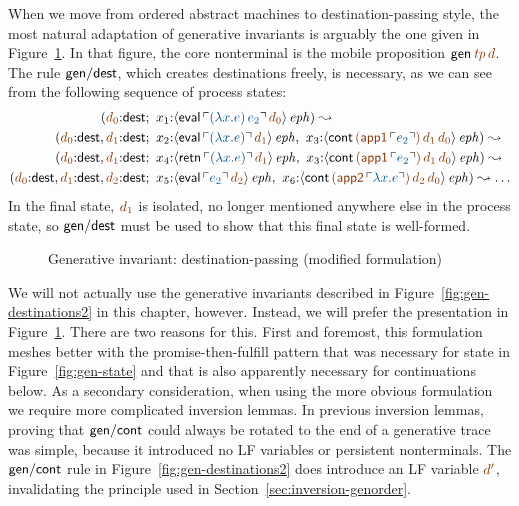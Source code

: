 When we move from ordered abstract machines to destination-passing
style, the most natural adaptation of generative invariants is
arguably the one given in Figure~\ref{fig:gen-destinations}. In that
figure, the core nonterminal is the mobile proposition ${\sf
  gen}\,\lf{{\it tp}}\,\lf{d}$. The rule ${\sf gen/dest}$, which 
creates destinations freely, is
necessary, as we can see from the following sequence of 
process states:
\begin{align*}
( \lf{d_0}{:}{\sf dest}&; ~
       x_1{:}\iseph{\susp{{\sf eval}
          \,\lf{\interp{(\lambda x.e)\,e_2}}\,\lf{d_0}}}
) 
\leadsto
\\
( \lf{d_0}{:}{\sf dest}, \lf{d_1}{:}{\sf dest}&; ~ 
       x_2{:}\iseph{\susp{{\sf eval}\,\lf{\interp{(\lambda x.e)}}\,\lf{d_1}}}, ~
       x_3{:}\iseph{\susp{{\sf cont}
          \,\lf{({\sf app1}\,\interp{e_2})}\,\lf{d_1}\,\lf{d_0}}}
)
\leadsto
\\
( \lf{d_0}{:}{\sf dest}, \lf{d_1}{:}{\sf dest}&; ~ 
       x_4{:}\iseph{\susp{{\sf retn}\,\lf{\interp{(\lambda x.e)}}\,\lf{d_1}}}, ~
       x_3{:}\iseph{\susp{{\sf cont}
          \,\lf{({\sf app1}\,\interp{e_2})}\,\lf{d_1}\,\lf{d_0}}}
)
\leadsto
\\
( \lf{d_0}{:}{\sf dest}, \lf{d_1}{:}{\sf dest}, \lf{d_2}{:}{\sf dest}&; ~ 
       x_5{:}\iseph{\susp{{\sf eval}\,\lf{\interp{e_2}}\,\lf{d_2}}}, ~
       x_6{:}\iseph{\susp{{\sf cont}
          \,\lf{({\sf app2}\,\interp{\lambda x.e})}\,\lf{d_2}\,\lf{d_0}}}
)
\leadsto \ldots
\end{align*}
In the final state, $\lf{d_1}$ is isolated, no longer mentioned
anywhere else in the process state, so ${\sf gen/dest}$ must be used
to show that this final state is well-formed.

\begin{figure}[tp]
\caption{Generative invariant: destination-passing (modified formulation)}
\label{fig:gen-destinations} 
\end{figure}

We will not actually use the generative invariants described in
Figure~\ref{fig:gen-destinations2} in this chapter, however. Instead,
we will prefer the presentation in Figure~\ref{fig:gen-destinations}.
There are two reasons for this. First and foremost, this formulation
meshes better with the promise-then-fulfill pattern that was necessary
for state in Figure~\ref{fig:gen-state} and that is also apparently
necessary for continuations below. As a secondary consideration, when
using the more obvious formulation we require more complicated
inversion lemmas. In previous inversion lemmas, proving that ${\sf
  gen/cont}$ could always be rotated to the end of a generative trace
was simple, because it introduced no LF variables or persistent
nonterminals. The ${\sf gen/cont}$ rule in
Figure~\ref{fig:gen-destinations2} does introduce an LF variable
$\lf{d'}$, invalidating the principle used in
Section~\ref{sec:inversion-genorder}.

